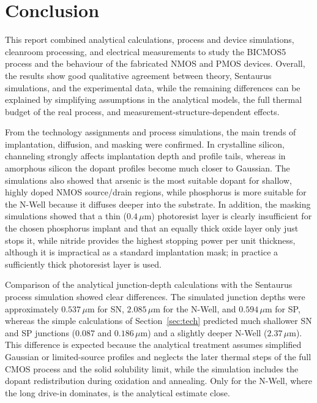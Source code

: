 \section{Conclusion}
\label{sec:conclusion}

This report combined analytical calculations, process and device simulations, cleanroom processing, and electrical measurements to study the BICMOS5 process and the behaviour of the fabricated NMOS and PMOS devices. Overall, the results show good qualitative agreement between theory, Sentaurus simulations, and the experimental data, while the remaining differences can be explained by simplifying assumptions in the analytical models, the full thermal budget of the real process, and measurement-structure-dependent effects.

From the technology assignments and process simulations, the main trends of implantation, diffusion, and masking were confirmed. In crystalline silicon, channeling strongly affects implantation depth and profile tails, whereas in amorphous silicon the dopant profiles become much closer to Gaussian. The simulations also showed that arsenic is the most suitable dopant for shallow, highly doped NMOS source/drain regions, while phosphorus is more suitable for the N-Well because it diffuses deeper into the substrate. In addition, the masking simulations showed that a thin ($0.4\,\mu\text{m}$) photoresist layer is clearly insufficient for the chosen phosphorus implant and that an equally thick oxide layer only just stops it, while nitride provides the highest stopping power per unit thickness, although it is impractical as a standard implantation mask; in practice a sufficiently thick photoresist layer is used.

Comparison of the analytical junction-depth calculations with the Sentaurus process simulation showed clear differences. The simulated junction depths were approximately $0.537\,\mu\text{m}$ for SN, $2.085\,\mu\text{m}$ for the N-Well, and $0.594\,\mu\text{m}$ for SP, whereas the simple calculations of Section~\ref{sec:tech} predicted much shallower SN and SP junctions ($0.087$ and $0.186\,\mu\text{m}$) and a slightly deeper N-Well ($2.37\,\mu\text{m}$). This difference is expected because the analytical treatment assumes simplified Gaussian or limited-source profiles and neglects the later thermal steps of the full CMOS process and the solid solubility limit, while the simulation includes the dopant redistribution during oxidation and annealing. Only for the N-Well, where the long drive-in dominates, is the analytical estimate close.

